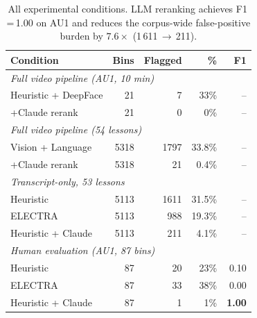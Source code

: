 \documentclass[10pt,twocolumn,letterpaper]{article}
\begin{document}
\begin{table}[t]
\small\centering
\setlength{\tabcolsep}{4pt}
\begin{tabular}{lrrrr}
\toprule
\textbf{Condition} & \textbf{Bins} & \textbf{Flagged} & \textbf{\%} & \textbf{F1} \\
\midrule
\multicolumn{5}{l}{\textit{Full video pipeline (AU1, 10 min)}} \\
\quad Heuristic + DeepFace  & 21 & 7 & 33\% & {--}  \\
\quad +Claude rerank        & 21 & 0 &  0\% & {--}  \\
\midrule
\multicolumn{5}{l}{\textit{Full video pipeline (54 lessons)}} \\
\quad Vision + Language     & 5318 & 1797 & 33.8\% & {--} \\
\quad +Claude rerank        & 5318 &   21 &  0.4\% & {--} \\
\midrule
\multicolumn{5}{l}{\textit{Transcript-only, 53 lessons}} \\
\quad Heuristic             & 5113 & 1611 & 31.5\% & {--} \\
\quad ELECTRA               & 5113 &  988 & 19.3\% & {--} \\
\quad Heuristic + Claude    & 5113 &  211 &  4.1\% & {--} \\
\midrule
\multicolumn{5}{l}{\textit{Human evaluation (AU1, 87 bins)}} \\
\quad Heuristic             & 87 & 20 & 23\% & 0.10 \\
\quad ELECTRA               & 87 & 33 & 38\% & 0.00 \\
\quad Heuristic + Claude    & 87 &  1 &  1\% & \textbf{1.00} \\
\bottomrule
\end{tabular}
\caption{All experimental conditions.  LLM reranking achieves
F1\,=\,1.00 on AU1 and reduces the corpus-wide false-positive
burden by $7.6\times$ (1\,611\,$\to$\,211).}
\label{table:results}
\end{table}
\end{document}
